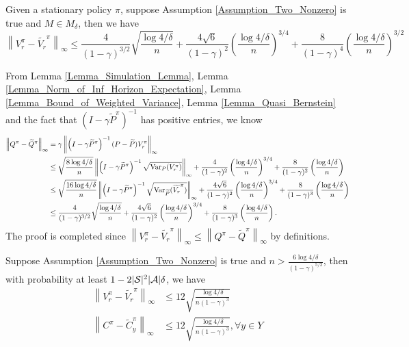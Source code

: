 \begin{lemma}\label{Lemma_Bound_on_V_Same_Pi}
Given a stationary policy $\pi$, suppose Assumption \ref{Assumption_Two_Nonzero} is true and $M\in M_\delta$, then we have
$$\left\|V_r^\pi -\widetilde{V_r}^\pi\right\|_\infty\leq \frac{4}{(1-\gamma)^{3/2}}\sqrt{\frac{\log 4/\delta}{n}} +\frac{4\sqrt{6}}{(1-\gamma)^2}\left(\frac{\log 4/\delta}{n}\right)^{3/4}+ \frac{8}{(1-\gamma)^4}\left(\frac{\log 4/\delta}{n}\right)^{3/2}
$$
\end{lemma}
From Lemma \ref{Lemma_Simulation_Lemma}, Lemma \ref{Lemma_Norm_of_Inf_Horizon_Expectation}, Lemma \ref{Lemma_Bound_of_Weighted_Variance}, Lemma \ref{Lemma_Quasi_Bernstein} and the fact that $\left(I-\gamma \widetilde{P}^{\pi}\right)^{-1}$ has positive entries, we know
$$
\begin{aligned}
\left\|Q^\pi-\widetilde {Q}^\pi\right\|_\infty&=\gamma\left\|\left(I-\gamma \widetilde{P}^{\pi}\right)^{-1}(P-\widetilde{P}) V_r^{\pi}\right\|_\infty\\
&\leq \sqrt{\frac{8\log 4/\delta}{n}}\left\|\left(I-\gamma\widetilde{P}^{\pi}\right)^{-1}\sqrt{\mathrm{Var}_{P}(V_r^\pi)}\right\|_\infty+\frac{4}{(1-\gamma)^2}\left(\frac{\log 4/\delta}{n}\right)^{3/4}+\frac{8}{(1-\gamma)^2}\left(\frac{\log 4/\delta}{n}\right)\\
&\leq \sqrt{\frac{16\log 4/\delta}{n}}\left\|\left(I-\gamma\widetilde{P}^{\pi}\right)^{-1}\sqrt{\mathrm{Var}_{\widetilde P}(\widetilde{V_r}^\pi)}\right\|_\infty +\frac{4\sqrt{6}}{(1-\gamma)^2}\left(\frac{\log 4/\delta}{n}\right)^{3/4}+ \frac{8}{(1-\gamma)^3}\left(\frac{\log 4/\delta}{n}\right)\\
&\leq \frac{4}{(1-\gamma)^{3/2}}\sqrt{\frac{\log 4/\delta}{n}} +\frac{4\sqrt{6}}{(1-\gamma)^2}\left(\frac{\log 4/\delta}{n}\right)^{3/4}+ \frac{8}{(1-\gamma)^3}\left(\frac{\log 4/\delta}{n}\right).
\end{aligned}
$$
The proof is completed since $\left\|V_r^\pi -\widetilde{V_r}^\pi\right\|_{\infty}\leq\left\|Q^\pi -\widetilde{Q}^\pi\right\|_{\infty}$ by definitions.
\endproof

\begin{lemma}\label{Lemma_Bound_on_V_Same_Pi_Leading}
Suppose Assumption \ref{Assumption_Two_Nonzero} is true and $n>\frac{6\log 4/\delta}{(1-\gamma)^{5/2}}$, then with probability at least $1-2|{\mathcal{S}}|^2|{\mathcal{A}}|\delta$, we have
$$
\begin{aligned}
\left\|V_r^\pi -\widetilde{V_r}^\pi\right\|_\infty&\leq 12\sqrt{\frac{\log 4/\delta}{n(1-\gamma)^3}}\\
\left\|C^\pi -\widetilde{C}_y^\pi\right\|_\infty&\leq 12\sqrt{\frac{\log 4/\delta}{n(1-\gamma)^3}},\forall y\in Y\\
\end{aligned}
$$
\end{lemma}

